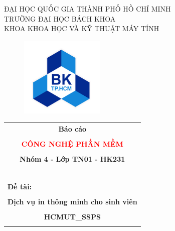 \documentclass[a4paper]{article}
\begin{document}
\begin{titlepage}
\begin{center}
    ĐẠI HỌC QUỐC GIA THÀNH PHỐ HỒ CHÍ MINH \\
    TRƯỜNG ĐẠI HỌC BÁCH KHOA \\
    KHOA KHOA HỌC VÀ KỸ THUẬT MÁY TÍNH 
\end{center}

\vspace{0.3cm}

\begin{figure}[h!]
\begin{center}
\includegraphics[width=4cm]{hcmut.png}
\end{center}
\end{figure}

\begin{center}
\begin{tabular}{c}
\multicolumn{1}{c}{\textbf{{\huge Báo cáo}}}\\\\
\multicolumn{1}{c}{\textcolor{red}{\textbf{{\huge CÔNG NGHỆ PHẦN MỀM}}}}\\\\
\multicolumn{1}{c}{\textbf{{\Large Nhóm 4 - Lớp TN01 - HK231}}}\\

~~\\
\hline
\\
\multicolumn{1}{l}{\textbf{{\large Đề tài:}}}\\\\
\huge{\hspace{0.5cm}\textbf{Dịch vụ in thông minh cho sinh viên}}\\\\
\huge{\textbf{HCMUT\_SSPS}}\\\\

\hline
\end{tabular}
\end{center}

\vspace{0.5cm}


\end{titlepage}
\end{document}
